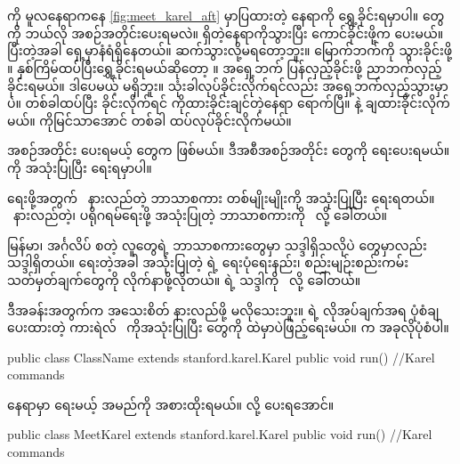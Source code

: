 \begin{sloppypar}
\section{ \mmprogram}
\enbeeper ကို မူလနေရာကနေ \Fig \vref*{fig:meet_karel_aft} မှာပြထားတဲ့ နေရာကို ရွှေ့ခိုင်းရမှာပါ။ \mmcommand တွေကို ဘယ်လို အစဉ်အတိုင်းပေးရမလဲ။ \mmbeeper ရှိတဲ့နေရာကိုသွားပြီး \mmbeeper ကောင်ခိုင်းဖို့က  \mmcommand ပေးမယ်။ ပြီးတဲ့အခါ ရှေ့မှာနံရံရှိနေတယ်။ ဆက်သွားလို့မရတော့ဘူး။ မြောက်ဘက်ကို သွားခိုင်းဖို့ ။ နှစ်ကြိမ်ထပ်ပြီးရွှေ့ခိုင်းရမယ်ဆိုတော့ ။ အရှေ့ဘက် ပြန်လှည့်ခိုင်းဖို့ ညာဘက်လှည့်ခိုင်းရမယ်။ ဒါပေမယ့်  \mmcommand မရှိဘူး။  သုံးခါလုပ်ခိုင်းလိုက်ရင်လည်း အရှေ့ဘက်လှည့်သွားမှာပဲ။ တစ်ခါထပ်ပြီး  ခိုင်းလိုက်ရင် \mmbeeper ကိုထားခိုင်းချင်တဲ့နေရာ ရောက်ပြီ။  နဲ့ \mmbeeper ချထားခိုင်းလိုက်မယ်။ \mmbeeper ကိုမြင်သာအောင်  တစ်ခါ ထပ်လုပ်ခိုင်းလိုက်မယ်။

အစဉ်အတိုင်း ပေးရမယ့် \mmcommand တွေက  ဖြစ်မယ်။ ဒီအစီအစဉ်အတိုင်း \mmcommand တွေကို \mmprogram ရေးပေးရမယ်။ \enJPL ကို အသုံးပြုပြီး ရေးရမှာပါ။ 

\mmprogram ရေးဖို့အတွက် \encomputer\ နားလည်တဲ့ ဘာသာစကား တစ်မျိုးမျိုးကို အသုံးပြုပြီး ရေးရတယ်။ \mmcomputer\ နားလည်တဲ့၊ \mmcomputer ပရိုဂရမ်ရေးဖို့ အသုံးပြုတဲ့ ဘာသာစကားကို \enPL\ လို့ ခေါ်တယ်။ 

မြန်မာ၊ အင်္ဂလိပ် စတဲ့ လူတွေရဲ့ ဘာသာစကားတွေမှာ သဒ္ဒါရှိသလိုပဲ \mmPL တွေမှာလည်း သဒ္ဒါရှိတယ်။ \mmprogram ရေးတဲ့အခါ အသုံးပြုတဲ့ \mmPL ရဲ့ ရေးပုံရေးနည်း၊ စည်းမျဉ်းစည်းကမ်း သတ်မှတ်ချက်တွေကို လိုက်နာဖို့လိုတယ်။ \mmPL ရဲ့ သဒ္ဒါကို \ensyntax\ လို့ ခေါ်တယ်။

ဒီအခန်းအတွက်က \mmsyntax အသေးစိတ် နားလည်ဖို့ မလိုသေးဘူး။ \enJPL ရဲ့ လိုအပ်ချက်အရ ပုံစံချပေးထားတဲ့ ကားရဲလ် \mmprogram\ \entemplate ကိုအသုံးပြုပြီး \mmcommand တွေကို \entemplate ထဲမှာပဲဖြည့်ရေးမယ်။ \entemplate က အခုလိုပုံစံပါ။

\begin{lstcodesimple}[float, caption=ကားရဲလ် ပရိုဂရမ် template, label={lst:Karel_template}]
public class ClassName extends stanford.karel.Karel { 
        public void run() {
                //Karel commands
        }        
}
\end{lstcodesimple}

\noindent {} နေရာမှာ ရေးမယ့် \mmprogram အမည်ကို အစားထိုးရမယ်။  လို့ ‌ပေးရအောင်။
\begin{lstcodeminimal}[]
public class MeetKarel extends stanford.karel.Karel { 
        public void run() {
                //Karel commands
        }        
}
\end{lstcodeminimal} 


\end{sloppypar}

